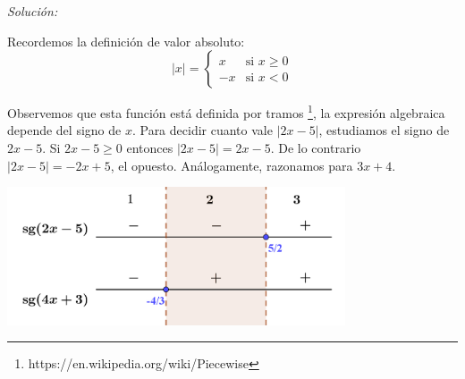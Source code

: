 \documentclass[10pt,a4paper]{article}
\begin{document}
\noindent
\emph{Solución:}

\noindent
Recordemos la definición de valor absoluto:
\begin{equation*}
  \vert x \vert =
  \begin{cases}
    x & \mbox{si } x\geq 0 \\
   -x & \mbox{si } x < 0
  \end{cases}
\end{equation*}

\noindent
Observemos que esta función está definida por tramos
\footnote{https://en.wikipedia.org/wiki/Piecewise},
la expresión algebraica depende del signo de $x$.
Para decidir cuanto vale $|2x - 5|$, estudiamos el signo de $2x-5$.
Si $2x-5 \geq 0$ entonces $|2x-5| = 2x-5$. De lo contrario $|2x-5| = -2x+5$,
el opuesto. Análogamente, razonamos para $ 3x+4$.

\begin{center}
\includegraphics[width=100mm]{signo}
\end{center}
\end{document}
